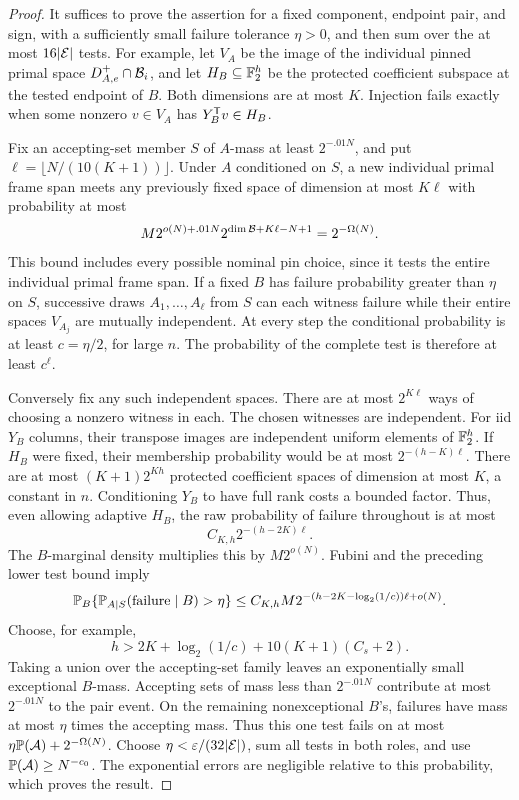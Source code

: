 \begin{proof}
It suffices to prove the assertion for a fixed component, endpoint
pair, and sign, with a sufficiently small failure tolerance
\(\eta>0\), and then sum over the at most \(16|\mathcal E|\) tests.
For example, let \(V_A\) be the image of the individual pinned
primal space \(D_{A,e}^+\cap\mathcal B_i\), and let \(H_B\subseteq\mathbb F_2^h\)
be the protected coefficient subspace at the tested endpoint
of \(B\).  Both dimensions are at most \(K\).  Injection fails
exactly when some nonzero \(v\in V_A\) has
\(Y_B^{\mathsf T} v\in H_B\).

Fix an accepting-set member \(S\) of \(A\)-mass at least
\(2^{-.01N}\), and put
\(\ell=\lfloor N/(10(K+1))\rfloor\).
Under \(A\) conditioned on \(S\), a new individual primal
frame span meets any previously fixed space of dimension at
most \(K\ell\) with probability at most
\[
 M2^{o(N)+.01N}
 2^{\dim\mathcal B+K\ell-N+1}=2^{-\Omega(N)}.
\]
This bound includes every possible nominal pin choice, since
it tests the entire individual primal frame span.
If a fixed \(B\) has failure probability greater than \(\eta\)
on \(S\), successive draws \(A_1,\ldots,A_\ell\) from \(S\)
can each witness failure while their entire spaces \(V_{A_j}\)
are mutually independent.  At every step the conditional
probability is at least \(c=\eta/2\), for large \(n\).
The probability of the complete test is therefore at least
\(c^\ell\).

Conversely fix any such independent spaces.  There are at most
\(2^{K\ell}\) ways of choosing a nonzero witness in each.
The chosen witnesses are independent.  For iid \(Y_B\) columns,
their transpose images are independent uniform elements of
\(\mathbb F_2^h\).  If \(H_B\) were fixed, their membership probability
would be at most \(2^{-(h-K)\ell}\).
There are at most \((K+1)2^{Kh}\) protected coefficient spaces
of dimension at most \(K\), a constant in \(n\).
Conditioning \(Y_B\) to have full rank costs a bounded factor.
Thus, even allowing adaptive \(H_B\), the raw probability of
failure throughout is at most
\[
 C_{K,h}2^{-(h-2K)\ell}.
\]
The \(B\)-marginal density multiplies this by \(M2^{o(N)}\).
Fubini and the preceding lower test bound imply
\[
 \mathbb P_B\{\mathbb P_{A\mid S}(\text{failure}\mid B)>\eta\}
 \le C_{K,h}M
 2^{-(h-2K-\log_2(1/c))\ell+o(N)}.
 \]
Choose, for example,
\[
 h>2K+\log_2(1/c)+10(K+1)(C_s+2).
 \]
Taking a union over the accepting-set family leaves an
exponentially small exceptional \(B\)-mass.
Accepting sets of mass less than \(2^{-.01N}\) contribute
at most \(2^{-.01N}\) to the pair event.  On the remaining
nonexceptional \(B\)'s, failures have mass at most \(\eta\)
times the accepting mass.  Thus this one test fails on at
most \(\eta\mathbb P({\cal A})+2^{-\Omega(N)}\).
Choose \(\eta<\varepsilon/(32|\mathcal E|)\), sum all tests in both roles,
and use \(\mathbb P({\cal A})\ge N^{-c_0}\).
The exponential errors are negligible relative to this
probability, which proves the result.
\end{proof}

